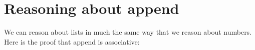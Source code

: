 \hypertarget{reasoning-about-append}{%
\section{Reasoning about append}\label{reasoning-about-append}}

We can reason about lists in much the same way that we reason about
numbers. Here is the proof that append is associative:

\begin{fence}
\begin{code}%
\>[0]\AgdaSpace{}%
\AgdaSymbol{:}\AgdaSpace{}%
\AgdaSpace{}%
\AgdaSymbol{\{}\AgdaSpace{}%
\AgdaSymbol{:}\AgdaSpace{}%
\AgdaSymbol{\}}\AgdaSpace{}%
\AgdaSymbol{(}\AgdaSpace{}%
\AgdaSpace{}%
\AgdaSpace{}%
\AgdaSymbol{:}\AgdaSpace{}%
\AgdaSpace{}%
\AgdaSymbol{)}\<%
\\
\>[0][@{}l@{\AgdaIndent{0}}]%
\>[2]\AgdaSpace{}%
\AgdaSymbol{(}\AgdaSpace{}%
\AgdaOperator{\AgdaFunction{++}}\AgdaSpace{}%
\AgdaSymbol{)}\AgdaSpace{}%
\AgdaOperator{\AgdaFunction{++}}\AgdaSpace{}%
\AgdaSpace{}%
\AgdaSpace{}%
\AgdaSpace{}%
\AgdaOperator{\AgdaFunction{++}}\AgdaSpace{}%
\AgdaSymbol{(}\AgdaSpace{}%
\AgdaOperator{\AgdaFunction{++}}\AgdaSpace{}%
\AgdaSymbol{)}\<%
\\
\>[0]\AgdaSpace{}%
\AgdaInductiveConstructor{[]}\AgdaSpace{}%
\AgdaSpace{}%
\AgdaSpace{}%
\AgdaSymbol{=}\<%
\\
\>[0][@{}l@{\AgdaIndent{0}}]%
\>[2]\<%
\\
\>[2][@{}l@{\AgdaIndent{0}}]%
\>[4]\AgdaSymbol{(}\AgdaInductiveConstructor{[]}\AgdaSpace{}%
\AgdaOperator{\AgdaFunction{++}}\AgdaSpace{}%
\AgdaSymbol{)}\AgdaSpace{}%
\AgdaOperator{\AgdaFunction{++}}\AgdaSpace{}%
\<%
\\
%
\>[2]\<%
\\
\>[2][@{}l@{\AgdaIndent{0}}]%
\>[4]\AgdaSpace{}%
\AgdaOperator{\AgdaFunction{++}}\AgdaSpace{}%
\<%
\\
%
\>[2]\<%
\\
\>[2][@{}l@{\AgdaIndent{0}}]%
\>[4]\AgdaInductiveConstructor{[]}\AgdaSpace{}%

\end{code}
\end{fence}
